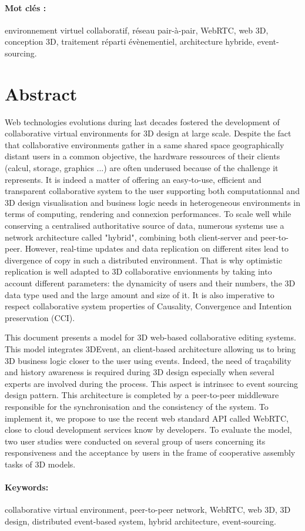 \paragraph{Mot clés : }environnement virtuel collaboratif, réseau pair-à-pair, WebRTC, web 3D, conception 3D, traitement réparti évènementiel, architecture hybride, event-sourcing.
\pagebreak
\section*{Abstract}

Web technologies evolutions during last decades fostered the development of 
collaborative virtual environments for 3D design at large scale. Despite the fact 
that collaborative environments gather in a same shared space geographically 
distant users in a common objective, the hardware ressources of their clients (calcul, 
storage, graphics ...) are often underused because of the challenge it represents. It is indeed 
a matter of offering an easy-to-use, efficient and transparent collaborative system 
to the user supporting both computationnal and 3D design visualisation and 
business logic needs in heterogeneous environments in terms of computing, 
rendering and connexion performances. To scale well while conserving a 
centralised authoritative source of data, numerous systems use a network 
architecture called "hybrid", combining both client-server and peer-to-peer. 
However, real-time updates and data replication on different sites lead to 
divergence of copy in such a distributed environment. That is why optimistic 
replication is well adapted to 3D collaborative envionments by taking into account 
different parameters: the dynamicity of users and their numbers, the 3D data type 
used and the large amount and size of it. It is also imperative to respect 
collaborative system properties of Causality, Convergence and Intention 
preservation (CCI).

This document presents a model for 3D web-based collaborative editing systems. This model integrates 3DEvent, an client-based architecture allowing us to bring 3D business logic closer to the user using events. Indeed, the need of traçability and history awareness is required during 3D design especially when several experts are involved during the process. This aspect is intrinsec to event sourcing design pattern. This architecture is completed by a peer-to-peer middleware responsible for the synchronisation and the consistency of the system. To implement it, we propose to use the recent web standard API called WebRTC, close to cloud development services know by developers. To evaluate the model, two user studies were conducted on several group of users concerning its responsiveness and the acceptance by users in the frame of cooperative assembly tasks of 3D models.




\paragraph{Keywords: }collaborative virtual environment, peer-to-peer network, WebRTC, web 3D, 3D design, distributed event-based system, hybrid architecture, event-sourcing.

\pagebreak